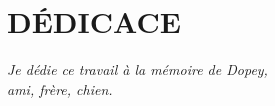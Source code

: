 \chapter*{DÉDICACE}\thispagestyle{headings}
\begin{flushright}
  \itshape
  Je dédie ce travail à la mémoire de Dopey,\\
  ami, frère, chien.
\end{flushright}
